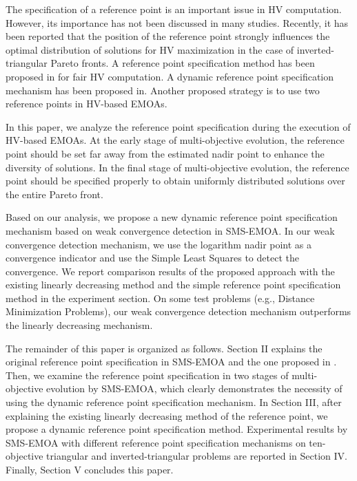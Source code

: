 \documentclass[conference]{IEEEtran}
\begin{document}
The specification of a reference point is an important issue in HV computation. 
However, its importance has not been discussed in many studies. 
Recently, it has been reported that the position of the reference point strongly influences the optimal distribution of solutions 
for HV maximization in the case of inverted-triangular Pareto fronts\cite{hisao:RPhowtoSpecify, hisao:RPspecify, hisao:RPexplanation}. 
A reference point specification method has been proposed in \cite{hisao:RPhowtoSpecify} for fair HV computation.
A dynamic reference point specification mechanism has been proposed in\cite{hisao:dynamic}.
Another proposed strategy is to use two reference points in HV-based EMOAs\cite{hisao:twoRP}. 

In this paper, we analyze the reference point specification during the execution of HV-based EMOAs.
At the early stage of multi-objective evolution, 
the reference point should be set far away from the estimated nadir point to enhance the diversity of solutions. 
In the final stage of multi-objective evolution, 
the reference point should be specified properly to obtain uniformly distributed solutions over the entire Pareto front.

Based on our analysis, we propose a new dynamic reference point specification mechanism based on weak convergence detection in SMS-EMOA. 
In our weak convergence detection mechanism, we use the logarithm nadir point as a convergence indicator
and use the Simple Least Squares\cite{SimpleLeastSquares} to detect the convergence. 
We report comparison results of the proposed approach with the existing linearly decreasing method\cite{hisao:dynamic} and 
the simple reference point specification method in the experiment section. 
On some test problems (e.g., Distance Minimization Problems\cite{dmp}), 
our weak convergence detection mechanism outperforms the linearly decreasing mechanism. 

The remainder of this paper is organized as follows. 
Section II explains the original reference point specification in SMS-EMOA and the one proposed in \cite{hisao:RPhowtoSpecify}. 
Then, we examine the reference point specification in two stages of multi-objective evolution by SMS-EMOA, 
which clearly demonstrates the necessity of using the dynamic reference point specification mechanism. 
In Section III, after explaining the existing linearly decreasing method of the reference point, we propose a dynamic reference point
specification method. 
Experimental results by SMS-EMOA with different reference point specification mechanisms 
on ten-objective triangular and inverted-triangular problems are reported in Section IV. 
Finally, Section V concludes this paper. 
\end{document}
